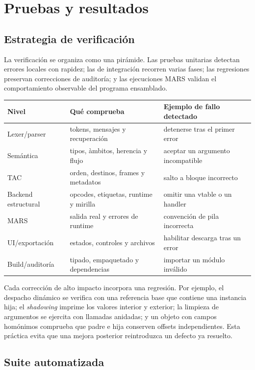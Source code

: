 \documentclass[11pt,letterpaper,oneside]{report}
\begin{document}
\chapter{Pruebas y resultados}

\section{Estrategia de verificaci\'on}

La verificaci\'on se organiza como una pir\'amide. Las pruebas unitarias detectan errores locales con rapidez; las de integraci\'on recorren varias fases; las regresiones preservan correcciones de auditor\'ia; y las ejecuciones MARS validan el comportamiento observable del programa ensamblado.

\begin{longtable}{p{3.1cm}p{4.8cm}p{5.2cm}}
\toprule
Nivel & Qu\'e comprueba & Ejemplo de fallo detectado\\\midrule
\endhead
Lexer/parser & tokens, mensajes y recuperaci\'on & detenerse tras el primer error\\
Sem\'antica & tipos, \`ambitos, herencia y flujo & aceptar un argumento incompatible\\
TAC & orden, destinos, frames y metadatos & salto a bloque incorrecto\\
Backend estructural & opcodes, etiquetas, runtime y mirilla & omitir una vtable o un handler\\
MARS & salida real y errores de runtime & convenci\'on de pila incorrecta\\
UI/exportaci\'on & estados, controles y archivos & habilitar descarga tras un error\\
Build/auditor\'ia & tipado, empaquetado y dependencias & importar un m\'odulo inv\'alido\\
\bottomrule
\end{longtable}

Cada correcci\'on de alto impacto incorpora una regresi\'on. Por ejemplo, el despacho din\'amico se verifica con una referencia base que contiene una instancia hija; el \emph{shadowing} imprime los valores interior y exterior; la limpieza de argumentos se ejercita con llamadas anidadas; y un objeto con campos hom\'onimos comprueba que padre e hija conserven offsets independientes. Esta pr\'actica evita que una mejora posterior reintroduzca un defecto ya resuelto.

\section{Suite automatizada}
\end{document}
